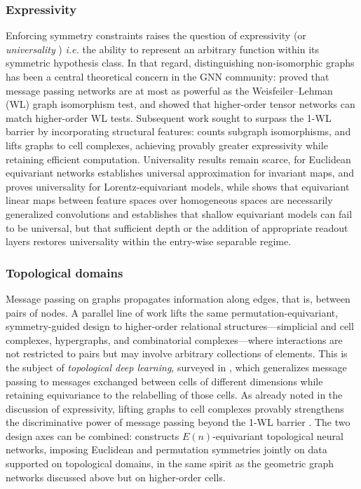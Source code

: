 \documentclass[mathematics,review,submit,moreauthors]{Definitions/mdpi}
\begin{document}
\subsubsection{Expressivity}
Enforcing symmetry constraints raises the question of expressivity (or \textit{universality} \cite{maass2024}) \textit{i.e.} the ability to represent an arbitrary function within its symmetric hypothesis class.
In that regard, distinguishing non-isomorphic graphs has been a central theoretical concern in the GNN community: \cite{xu2019} proved that message passing networks are at most as powerful as the Weisfeiler--Lehman (WL) graph isomorphism test, and \cite{maron2020} showed that higher-order tensor networks can match higher-order WL tests.
Subsequent work sought to surpass the 1-WL barrier by incorporating structural features: \cite{bouritsas2021} counts subgraph isomorphisms, and \cite{bodnar2021a} lifts graphs to cell complexes, achieving provably greater expressivity while retaining efficient computation.
Universality results remain scarce, for Euclidean equivariant networks \cite{yarotsky2018r} establishes universal approximation for invariant maps, and \cite{bogatskiy2020p3icml} proves universality for Lorentz-equivariant models, while \cite{kondor2018p3icml} shows that equivariant linear maps between feature spaces over homogeneous spaces are necessarily generalized convolutions and \cite{pacini2026} establishes that shallow equivariant models can fail to be universal, but that sufficient depth or the addition of appropriate readout layers restores universality within the entry-wise separable regime.

\subsubsection{Topological domains}
Message passing on graphs propagates information along edges, that is, between pairs of nodes.
A parallel line of work lifts the same permutation-equivariant, symmetry-guided design to higher-order relational structures---simplicial and cell complexes, hypergraphs, and combinatorial complexes---where interactions are not restricted to pairs but may involve arbitrary collections of elements.
This is the subject of \emph{topological deep learning}, surveyed in \cite{papillon2023}, which generalizes message passing to messages exchanged between cells of different dimensions while retaining equivariance to the relabelling of those cells.
As already noted in the discussion of expressivity, lifting graphs to cell complexes provably strengthens the discriminative power of message passing beyond the 1-WL barrier \cite{bodnar2021a}.
The two design axes can be combined: \cite{battiloro2024} constructs $E(n)$-equivariant topological neural networks, imposing Euclidean and permutation symmetries jointly on data supported on topological domains, in the same spirit as the geometric graph networks discussed above but on higher-order cells.
\end{document}
